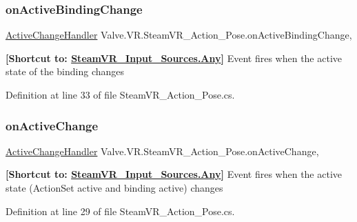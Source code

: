 \subsubsection{\texorpdfstring{onActiveBindingChange}{onActiveBindingChange}}
{\footnotesize\ttfamily \mbox{\hyperlink{class_valve_1_1_v_r_1_1_steam_v_r___action___pose_a3861a4b4b8ce246db2cc77e632a7f999}{Active\+Change\+Handler}} Valve.\+V\+R.\+Steam\+V\+R\+\_\+\+Action\+\_\+\+Pose.\+on\+Active\+Binding\+Change\hspace{0.3cm}{\ttfamily [add]}, {\ttfamily [remove]}}



{\bfseries{\mbox{[}Shortcut to\+: \mbox{\hyperlink{namespace_valve_1_1_v_r_a82e5bf501cc3aa155444ee3f0662853faed36a1ef76a59ee3f15180e0441188ad}{Steam\+V\+R\+\_\+\+Input\+\_\+\+Sources.\+Any}}\mbox{]}}} Event fires when the active state of the binding changes 



Definition at line 33 of file Steam\+V\+R\+\_\+\+Action\+\_\+\+Pose.\+cs.

\mbox{\label{class_valve_1_1_v_r_1_1_steam_v_r___action___pose_ae7a4fdfdb1267a24cd889cd2b017da31}} 
\subsubsection{\texorpdfstring{onActiveChange}{onActiveChange}}
{\footnotesize\ttfamily \mbox{\hyperlink{class_valve_1_1_v_r_1_1_steam_v_r___action___pose_a3861a4b4b8ce246db2cc77e632a7f999}{Active\+Change\+Handler}} Valve.\+V\+R.\+Steam\+V\+R\+\_\+\+Action\+\_\+\+Pose.\+on\+Active\+Change\hspace{0.3cm}{\ttfamily [add]}, {\ttfamily [remove]}}



{\bfseries{\mbox{[}Shortcut to\+: \mbox{\hyperlink{namespace_valve_1_1_v_r_a82e5bf501cc3aa155444ee3f0662853faed36a1ef76a59ee3f15180e0441188ad}{Steam\+V\+R\+\_\+\+Input\+\_\+\+Sources.\+Any}}\mbox{]}}} Event fires when the active state (Action\+Set active and binding active) changes 



Definition at line 29 of file Steam\+V\+R\+\_\+\+Action\+\_\+\+Pose.\+cs.

